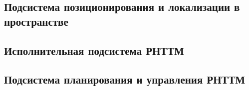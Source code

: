 \subsection{Подсистема позиционирования и локализации в пространстве}\label{subsec:ch1/sec2/sub2}


\subsection{Исполнительная подсистема РНТТМ}\label{subsec:ch1/sec2/sub3}


\subsection{Подсистема планирования и управления РНТТМ}\label{subsec:ch1/sec2/sub4}
